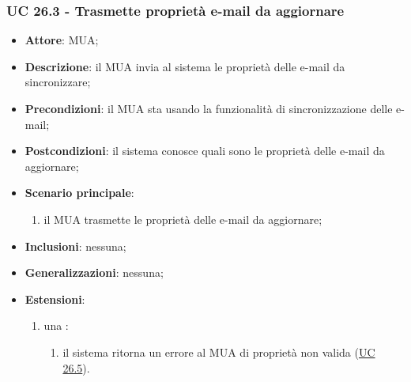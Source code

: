     \subsubsection{UC 26.3 - Trasmette proprietà e-mail da aggiornare} \label{sec:UC26.3}
    \begin{itemize}
        \item \textbf{Attore}: MUA;
        \item \textbf{Descrizione}: il MUA invia al sistema le proprietà delle e-mail da sincronizzare;
        \item \textbf{Precondizioni}: il MUA sta usando la funzionalità di sincronizzazione delle e-mail;
        \item \textbf{Postcondizioni}: il sistema conosce quali sono le proprietà delle e-mail da aggiornare;
        \item \textbf{Scenario principale}:
            \begin{enumerate}
                \item il MUA trasmette le proprietà delle e-mail da aggiornare;
            \end{enumerate}
        \item \textbf{Inclusioni}: nessuna;
        \item \textbf{Generalizzazioni}: nessuna;
        \item \textbf{Estensioni}:
            \begin{enumerate}[label=\alph*.]
                \item una :
                \begin{enumerate}[label=\arabic*.]
                    \item il sistema ritorna un errore al MUA di proprietà non valida (\hyperref[sec:UC26.5]{UC 26.5}).
                \end{enumerate}
            \end{enumerate}
    \end{itemize}


